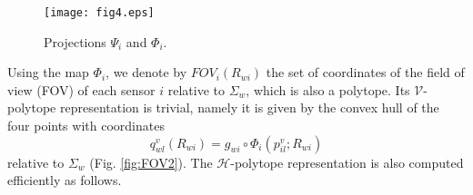 \documentclass[conference,letterpaper]{ieeeconf}
\newcommand{\V}{{\mathcal V}}
\newcommand{\ewi}{R_{wi}}
\begin{document}
\begin{figure}[t]
\begin{center}
\texttt{[image: fig4.eps]}
\caption{Projections $\Psi_i$ and $\Phi_i$.}
\label{fig:proj1}
\end{center}
\end{figure}



Using the map $\Phi_i$, we denote by $FOV_i(\ewi)$ the set of coordinates
of the field of view (FOV) of each sensor $i$ relative to $\Sigma_w$, which is also a polytope.
Its $\V$-polytope representation is trivial, namely it is given by
the convex hull of the four points with coordinates
\begin{equation}
{q}^{v}_{wl}(\ewi) = g_{wi}\circ \Phi_i(p^{v}_{il}; \ewi)
\label{eqn:arxiv1}
\end{equation}
relative to $\Sigma_w$
(Fig. \ref{fig:FOV2}).
The ${\mathcal H}$-polytope representation is also 
computed efficiently as follows.
\end{document}
